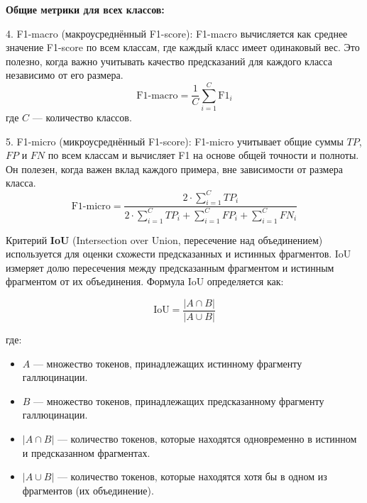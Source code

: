 \documentclass[12pt]{article}
\begin{document}
\textbf{Общие метрики для всех классов:}

4. F1-macro (макроусреднённый F1-score): F1-macro вычисляется как среднее значение F1-score по всем классам, где каждый класс имеет одинаковый вес. Это полезно, когда важно учитывать качество предсказаний для каждого класса независимо от его размера.
\[
\text{F1-macro} = \frac{1}{C} \sum_{i=1}^{C} \text{F1}_i
\]
где \( C \) — количество классов.

5. F1-micro (микроусреднённый F1-score): F1-micro учитывает общие суммы \( TP \), \( FP \) и \( FN \) по всем классам и вычисляет F1 на основе общей точности и полноты. Он полезен, когда важен вклад каждого примера, вне зависимости от размера класса.
\[
\text{F1-micro} = \frac{2 \cdot \sum_{i=1}^{C} TP_i}{2 \cdot \sum_{i=1}^{C} TP_i + \sum_{i=1}^{C} FP_i + \sum_{i=1}^{C} FN_i}
\]

%



%

Критерий \textbf{IoU} (Intersection over Union, пересечение над объединением) используется для оценки схожести предсказанных и истинных фрагментов. IoU измеряет долю пересечения между предсказанным фрагментом и истинным фрагментом от их объединения. Формула IoU определяется как:

\[
\text{IoU} = \frac{|A \cap B|}{|A \cup B|}
\]

где:
\begin{itemize}
    \item \( A \) — множество токенов, принадлежащих истинному фрагменту галлюцинации.
    \item \( B \) — множество токенов, принадлежащих предсказанному фрагменту галлюцинации.
    \item \( |A \cap B| \) — количество токенов, которые находятся одновременно в истинном и предсказанном фрагментах.
    \item \( |A \cup B| \) — количество токенов, которые находятся хотя бы в одном из фрагментов (их объединение).
\end{itemize}
\end{document}

